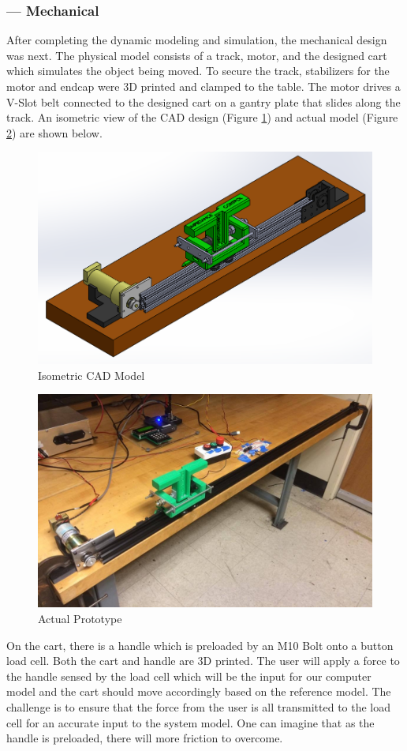 \subsubsection*{ --- Mechanical} 
After completing the dynamic modeling and simulation, the mechanical design was next. The physical model consists of a track, motor, and the designed cart which simulates the object being moved. To secure the track, stabilizers for the motor and endcap were 3D printed and clamped to the table. The motor drives a V-Slot belt connected to the designed cart on a gantry plate that slides along the track. An isometric view of the CAD design (Figure \ref{fig:Isometric_Full_View}) and actual model (Figure \ref{fig:Iso_Real_Full}) are shown below.

\begin{figure}[H]
	\centering
	\includegraphics[width=0.85\columnwidth]{Images/Isometric_Full_View}
	\caption{Isometric CAD Model}
	\label{fig:Isometric_Full_View}
\end{figure}
\begin{figure}[H]
	\begin{center}
		\includegraphics[width=0.85\columnwidth]{Images/Iso_Real_Full}
		\caption{Actual Prototype}
		\label{fig:Iso_Real_Full}
	\end{center}
\end{figure}
On the cart, there is a handle which is preloaded by an M10 Bolt onto a button load cell. Both the cart and handle are 3D printed. The user will apply a force to the handle sensed by the load cell which will be the input for our computer model and the cart should move accordingly based on the reference model. The challenge is to ensure that the force from the user is all transmitted to the load cell for an accurate input to the system model. One can imagine that as the handle is preloaded, there will more friction to overcome.

